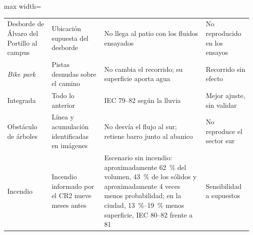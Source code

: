 \begin{table}[htbp]
\begin{adjustbox}{max width=\textwidth}
\begin{tabular}{@{}>{\raggedright\arraybackslash}p{}>{\raggedright\arraybackslash}p{}>{\raggedright\arraybackslash}p{}>{\raggedright\arraybackslash}p{}@{}}
Desborde de Álvaro del Portillo al campus & Ubicación supuesta del desborde & No llega al patio con los fluidos ensayados & No reproducido en los ensayos\\
\emph{Bike park} & Pistas desnudas sobre el camino & No cambia el recorrido; su superficie aporta agua & Recorrido sin efecto\\
Integrada & Todo lo anterior & IEC 79--82 según la lluvia & Mejor ajuste, sin validar\\
Obstáculo de árboles & Línea y acumulación identificadas en imágenes & No desvía el flujo al sur; retiene barro junto al abanico & No reproduce el sector sur\\
Incendio & Incendio informado por el CR2 nueve meses antes & Escenario sin incendio: aproximadamente \SI{62}{\percent} del volumen, \SI{43}{\percent} de los sólidos y aproximadamente 4 veces menos probabilidad; en la ciudad, \SIrange{13}{19}{\percent} menos superficie, IEC 80--82 frente a 81 & Sensibilidad a supuestos\\\bottomrule
\end{tabular}\end{adjustbox}
\end{table}
